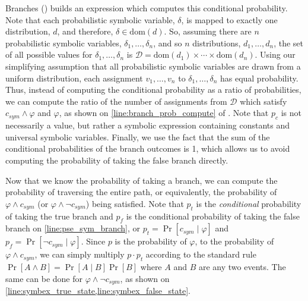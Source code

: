 \documentclass[acmsmall,review,anonymous]{acmart}\settopmatter{printfolios=true,printccs=false,printacmref=false}
\newcommand*\dom[1]{\mathrm{dom}\left( #1 \right)}
\begin{document}
\begin{paragraph}{Branches ()}
   builds an expression which computes this conditional probability.
	Note that each probabilistic symbolic variable, $\delta$, is mapped to exactly one distribution, $d$, and therefore, $\delta \in \dom{d}$.
	So, assuming there are $n$ probabilistic symbolic variables, $\delta_1,\ldots,\delta_n$, and so $n$ distributions, $d_1,\ldots,d_n$, the set of all possible values for $\delta_1,\ldots,\delta_n$ is $\mathcal{D} = \dom{d_1} \times \cdots \times \dom{d_n}$.
  Using our simplifying assumption that all probabilistic symbolic variables are drawn from a uniform distribution, each assignment $v_1, \dots, v_n$ to $\delta_1, \dots, \delta_n$ has equal probability.
  Thus, instead of computing the conditional probability as a ratio of probabilities, we can compute the ratio of the number of assignments from $\mathcal{D}$ which satisfy $c_{sym} \wedge \varphi$ and $\varphi$, as shown on \cref{line:branch_prob_compute} of .
	Note that $p_c$ is not necessarily a value, but rather a symbolic expression containing constants and universal symbolic variables.
	Finally, we use the fact that the sum of the conditional probabilities of the branch outcomes is 1, which allows us to avoid computing the probability of taking the false branch directly.

  Now that we know the probability of taking a branch, we can compute the probability of traversing the entire path, or equivalently, the probability of $\varphi \wedge c_{sym}$ (or $\varphi \wedge \neg c_{sym}$) being satisfied.
  Note that $p_t$ is the \textit{conditional} probability of taking the true branch and $p_f$ is the conditional probability of taking the false branch on \cref{line:pse_sym_branch}, or $p_t = \Pr[c_{sym} \mid \varphi]$ and $p_f = \Pr[\neg c_{sym} \mid \varphi]$.
  Since $p$ is the probability of $\varphi$, to the probability of $\varphi \wedge c_{sym}$, we can simply multiply $p \cdot p_t$ according to the standard rule $\Pr[A \wedge B] = \Pr[A \mid B]\Pr[B]$ where $A$ and $B$ are any two events.
  The same can be done for $\varphi \wedge \neg c_{sym}$, as shown on \cref{line:symbex_true_state,line:symbex_false_state}.
\end{paragraph}
\end{document}
